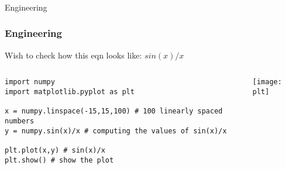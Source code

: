 \begin{frame}[fragile]\frametitle{}
\begin{center}
{\Large Engineering}
\end{center}
\end{frame}


\begin{frame}[fragile]\frametitle{Engineering}
Wish to check how this eqn looks like: $sin(x)/x$



\begin{columns}
    \begin{column}[T]{0.6\linewidth}

\begin{lstlisting}
import numpy
import matplotlib.pyplot as plt

x = numpy.linspace(-15,15,100) # 100 linearly spaced numbers
y = numpy.sin(x)/x # computing the values of sin(x)/x

plt.plot(x,y) # sin(x)/x
plt.show() # show the plot
\end{lstlisting}

    \end{column}
    \begin{column}[T]{0.4\linewidth}

\begin{center}
\texttt{[image: plt]}
\end{center}

    \end{column}
  \end{columns}
\end{frame}


